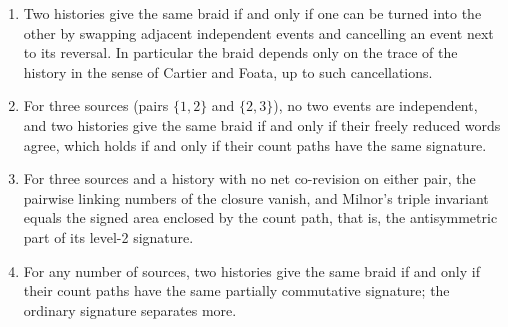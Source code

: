 \documentclass[11pt]{article}
\theoremstyle{definition}\newtheorem{definition}[theorem]{Definition}\newtheorem{remark}[theorem]{Remark}\newtheorem{example}[theorem]{Example}\newtheorem{problem}[theorem]{Open problem}\crefname{problem}{Problem}{Problems}
\begin{document}
\begin{proposition}\label{prop:ordrev}
\begin{enumerate}
\item[(i)] Two histories give the same braid if and only if one can be turned into the other by swapping adjacent independent events and cancelling an event next to its reversal. In particular the braid depends only on the trace of the history in the sense of Cartier and Foata, up to such cancellations.
\item[(ii)] For three sources (pairs $\{1,2\}$ and $\{2,3\}$), no two events are independent, and two histories give the same braid if and only if their freely reduced words agree, which holds if and only if their count paths have the same signature.
\item[(iii)] For three sources and a history with no net co-revision on either pair, the pairwise linking numbers of the closure vanish, and Milnor's triple invariant equals the signed area enclosed by the count path, that is, the antisymmetric part of its level-2 signature.
\item[(iv)] For any number of sources, two histories give the same braid if and only if their count paths have the same partially commutative signature; the ordinary signature separates more.
\end{enumerate}
\end{proposition}
\end{document}

